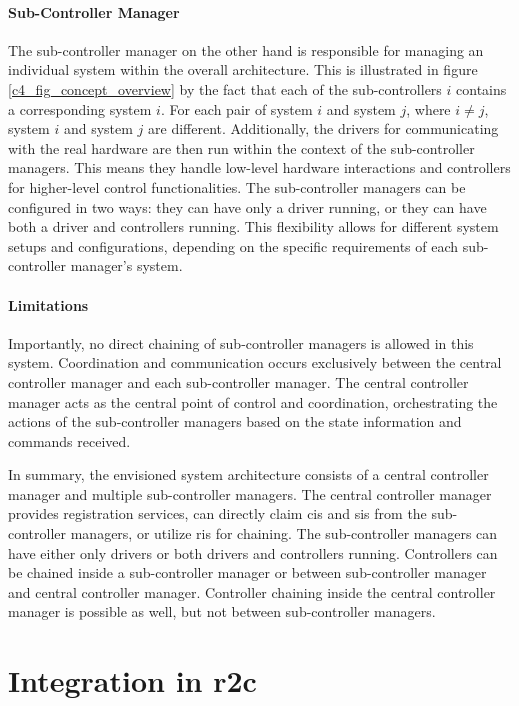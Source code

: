 \paragraph{Sub-Controller Manager}
The sub-controller manager on the other hand is responsible for managing an individual system within the overall architecture. This is illustrated in figure \ref{c4_fig_concept_overview} by the fact that each of the sub-controllers $i$ contains a corresponding system $i$. For each pair of system $i$ and system $j$, where $i\neq j$, system $i$ and system $j$ are different. \newline
Additionally, the drivers for communicating with the real hardware are then run within the context of the sub-controller managers. This means they handle low-level hardware interactions and controllers for higher-level control functionalities.\newline
The sub-controller managers can be configured in two ways: they can have only a driver running, or they can have both a driver and controllers running. This flexibility allows for different system setups and configurations, depending on the specific requirements of each sub-controller manager's system.
\paragraph{Limitations}
Importantly, no direct chaining of sub-controller managers is allowed in this system. Coordination and communication occurs exclusively between the central controller manager and each sub-controller manager. The central controller manager acts as the central point of control and coordination, orchestrating the actions of the sub-controller managers based on the state information and commands received.

In summary, the envisioned system architecture consists of a central controller manager and multiple sub-controller managers. The central controller manager provides registration services, can directly claim \glspl{ci} and \glspl{si} from the sub-controller managers, or utilize \glspl{ri} for chaining. The sub-controller managers can have either only drivers or both drivers and controllers running. Controllers can be chained inside a sub-controller manager or between sub-controller manager and central controller manager. Controller chaining inside the central controller manager is possible as well, but not between sub-controller managers.


\section{Integration in \gls{r2c}}

